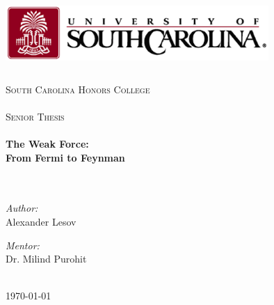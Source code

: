 \documentclass[a4paper,12pt]{book}
\begin{document}
\begin{titlepage}
\begin{center}

\includegraphics[width=100mm, height=25mm]{figures/usclogo}\\
%
\ \\ %
\textsc{\Large
%
South Carolina Honors College\\
\ \\
Senior Thesis\\
\ \\}
%
%
{\huge \bfseries
The Weak Force: \\ From Fermi to Feynman
\\}
\ \\
\ \\
\begin{minipage}{0.4\textwidth}
\begin{flushleft} \large
\emph{Author:}\\
Alexander Lesov\\
\end{flushleft}
\end{minipage}
%
\begin{minipage}{0.4\textwidth}
\begin{flushright} \large
\emph{Mentor:} \\
Dr. Milind Purohit\\
\footnotesize{\ }
\end{flushright}
\end{minipage}
%
\vfill %
%
{\large \today}
%
\end{center}

\end{titlepage}

\tableofcontents

\end{document}
